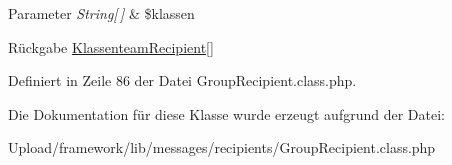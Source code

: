 \begin{DoxyParams}{Parameter}
{\em String\mbox{[}$\,$\mbox{]}} & \$klassen \\
\hline
\end{DoxyParams}
\begin{DoxyReturn}{Rückgabe}
\mbox{\hyperlink{class_klassenteam_recipient}{Klassenteam\+Recipient}}\mbox{[}\mbox{]} 
\end{DoxyReturn}


Definiert in Zeile 86 der Datei Group\+Recipient.\+class.\+php.



Die Dokumentation für diese Klasse wurde erzeugt aufgrund der Datei\+:\begin{DoxyCompactItemize}
\item 
Upload/framework/lib/messages/recipients/Group\+Recipient.\+class.\+php\end{DoxyCompactItemize}
